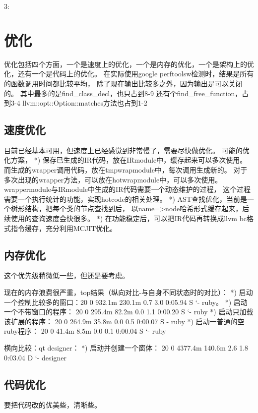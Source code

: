 3:

\chapter{优化}
优化包括四个方面，一个是速度上的优化，一个是内存的优化，一个是架构上的优化，还有一个是代码上的优化。
在实际使用google perftoolsw检测时，结果是所有的函数调用时间都比较平均，
除了现在输出比较多之外，因为输出是可以关闭的。
其中最多的是find\_class\_decl，也只占到8-9%
还有个find\_free\_function，占到3-4%
llvm::opt::Option::matches方法也占到1-2%

\section{速度优化}
目前已经基本可用，但速度上已经感觉到非常慢了，需要尽快做优化。
可能的优化方案，
*) 保存已生成的IR代码，放在IRmodule中，缓存起来可以多次使用。
而生成的wrapper调用代码，放在tmpwrapmodule中，每次调用生成新的。
对于多次出现的wrapper方法，可以放在hotwrapmodule中，可以多次使用。
wrappermodule与IRmodule中生成的IR代码需要一个动态维护的过程，
这个过程需要一个执行统计的功能，实现hotcode的相关处理。
*) AST查找优化，当前是一个树形结构，把每个类的节点查找到后，
以name=>node哈希形式缓存起来，后续使用的查询速度会快很多。
*) 在功能稳定后，可以把IR代码再转换成llvm bc格式指令缓存，充分利用MCJIT优化。


\section{内存优化}
这个优先级稍微低一些，但还是要考虑。

现在的内存浪费很严重，top结果（纵向对比-与自身不同状态时的对比）：
*) 启动一个控制比较多的窗口：20   0  932.1m 230.1m   0.7  3.0   0:05.94 S   `- ruby。
*) 启动一个不带窗口的程序： 20   0  295.4m  82.2m   0.0  1.1   0:00.20 S    `- ruby
*) 启动只加载该扩展的程序： 20   0  264.9m  35.8m   0.0  0.5   0:00.07 S    - ruby
*) 启动一普通的空ruby程序： 20   0   41.4m   8.5m   0.0  0.1   0:00.04 S   `- ruby

横向比较：qt designer：
*) 启动并创建一个窗体： 20   0 4377.4m 140.6m   2.6  1.8   0:03.04 D    `- designer

\section{代码优化}
要把代码改的优美些，清晰些。

